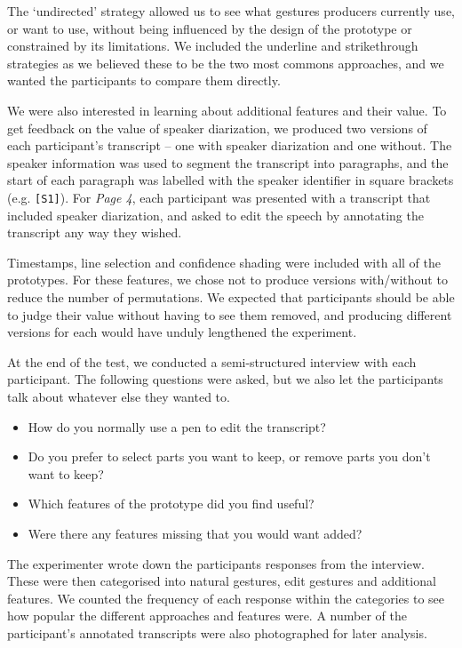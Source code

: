 The `undirected' strategy allowed us to see what gestures producers currently use, or want to use, without being
influenced by the design of the prototype or constrained by its limitations. We included the underline and
strikethrough strategies as we believed these to be the two most commons approaches, and we wanted the participants to
compare them directly.

We were also interested in learning about additional features and their value. To get feedback on the value of speaker
diarization, we produced two versions of each participant's transcript -- one with speaker diarization and one without.
The speaker information was used to segment the transcript into paragraphs, and the start of each paragraph was
labelled with the speaker identifier in square brackets (e.g.  \texttt{{[}S1{]}}).  For \textit{Page 4}, each
participant was presented with a transcript that included speaker diarization, and asked to edit the speech by
annotating the transcript any way they wished.

Timestamps, line selection and confidence shading were included with all of the prototypes. For these features, we
chose not to produce versions with/without to reduce the number of permutations. We expected that participants should
be able to judge their value without having to see them removed, and producing different versions for each would have
unduly lengthened the experiment.

At the end of the test, we conducted a semi-structured interview with each participant. The following questions were
asked, but we also let the participants talk about whatever else they wanted to.

{\singlespacing
  \begin{itemize}
    \item How do you normally use a pen to edit the transcript?
    \item Do you prefer to select parts you want to keep, or remove parts you don't want to keep?
    \item Which features of the prototype did you find useful?
    \item Were there any features missing that you would want added?
  \end{itemize}
}

The experimenter wrote down the participants responses from the interview. These were then categorised into natural
gestures, edit gestures and additional features. We counted the frequency of each response within the categories to see
how popular the different approaches and features were. A number of the participant's annotated transcripts were also
photographed for later analysis.

